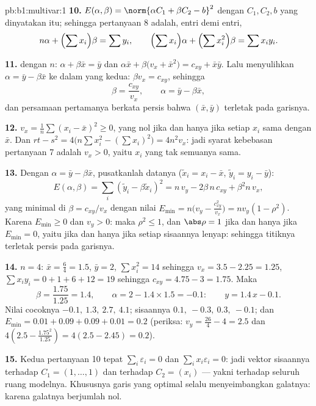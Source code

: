 \begin{solution}{pb:b1:multivar:1}
\textbf{10.} $E(\alpha, \beta) = \norm{\alpha C_1 + \beta C_2 -
b}^2$ dengan $C_1, C_2, b$ yang dinyatakan itu; sehingga 
pertanyaan 8 adalah, entri demi entri,
\[
n\alpha + \Bigl(\sum x_i\Bigr)\beta = \sum y_i,
\qquad
\Bigl(\sum x_i\Bigr)\alpha + \Bigl(\sum x_i^2\Bigr)\beta = \sum
x_i y_i .
\]

\textbf{11.}  dengan $n$: $\alpha + \beta\bar x = \bar y$
dan $\alpha\bar x + \beta\bigl(v_x + \bar x^2\bigr) = c_{xy} +
\bar x\bar y$. Lalu menyulihkan $\alpha = \bar y - \beta\bar x$ ke dalam
yang kedua: $\beta v_x = c_{xy}$, sehingga
\[
\beta = \frac{c_{xy}}{v_x}, \qquad \alpha = \bar y - \beta\bar
x ,
\]
dan persamaan pertamanya berkata persis bahwa $(\bar x, \bar y)$
terletak pada garisnya.

\textbf{12.} $v_x = \frac1n\sum(x_i - \bar x)^2 \geq 0$, yang nol
jika dan hanya jika setiap $x_i$ sama dengan $\bar x$. Dan $rt - s^2 = 4\bigl(n\sum
x_i^2 - (\sum x_i)^2\bigr) = 4n^2 v_x$: jadi syarat kebebasan
pertanyaan 7 adalah $v_x > 0$, yaitu $x_i$ yang tak semuanya sama.

\textbf{13.} Dengan $\alpha = \bar y - \beta\bar x$, pusatkanlah
datanya ($\tilde x_i = x_i - \bar x$, $\tilde y_i = y_i - \bar y$):
\[
E(\alpha, \beta) = \sum_i(\tilde y_i - \beta\tilde x_i)^2
= n\,v_y - 2\beta\,n\,c_{xy} + \beta^2 n\,v_x ,
\]
yang minimal di $\beta = c_{xy}/v_x$ dengan nilai $E_{\min} =
n\bigl(v_y - \frac{c_{xy}^2}{v_x}\bigr) = n v_y(1 - \rho^2)$.
Karena $E_{\min} \geq 0$ dan $v_y > 0$: maka $\rho^2 \leq 1$, dan
$\abs\rho = 1$ jika dan hanya jika $E_{\min} = 0$, yaitu jika dan hanya jika setiap sisaannya
lenyap: sehingga titiknya terletak persis pada garisnya.

\textbf{14.} $n = 4$: $\bar x = \frac64 = 1.5$, $\bar y = 2$,
$\sum x_i^2 = 14$ sehingga $v_x = 3.5 - 2.25 = 1.25$, $\sum x_iy_i =
0 + 1 + 6 + 12 = 19$ sehingga $c_{xy} = 4.75 - 3 = 1.75$. Maka
\[
\beta = \frac{1.75}{1.25} = 1.4,
\qquad
\alpha = 2 - 1.4\times1.5 = -0.1 :
\qquad y = 1.4\,x - 0.1 .
\]
Nilai cocoknya $-0.1,\ 1.3,\ 2.7,\ 4.1$; sisaannya $0.1,\ -0.3,\
0.3,\ -0.1$; dan $E_{\min} = 0.01 + 0.09 + 0.09 + 0.01 = 0.2$
(periksa: $v_y = \frac{26}4 - 4 = 2.5$ dan $4(2.5 -
\frac{1.75^2}{1.25}) = 4(2.5 - 2.45) = 0.2$).

\textbf{15.} Kedua  pertanyaan 10 tepat
$\sum_i\varepsilon_i = 0$ dan $\sum_i x_i\varepsilon_i =
0$: jadi vektor sisaannya  terhadap $C_1 = (1, \dots, 1)$
dan terhadap $C_2 = (x_i)$ --- yakni terhadap seluruh ruang modelnya. Khususnya
garis yang optimal selalu menyeimbangkan galatnya: karena galatnya
berjumlah nol.


\end{solution}
